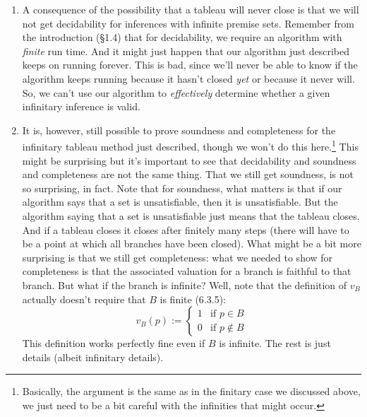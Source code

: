 \begin{enumerate}[\thesection.1]
		\item A consequence of the possibility that a tableau will never close is that we will not get decidability for inferences with infinite premise sets. Remember from the introduction (\S1.4) that for decidability, we require an algorithm with \emph{finite} run time. And it might just happen that our algorithm just described keeps on running forever. This is bad, since we'll never be able to know if the algorithm keeps running because it hasn't closed \emph{yet} or because it never will. So, we can't use our algorithm to \emph{effectively} determine whether a given infinitary inference is valid. 
	
		\item It is, however, still possible to prove soundness and completeness for the infinitary tableau method just described, though we won't do this here.\footnote{Basically, the argument is the same as in the finitary case we discussed above, we just need to be a bit careful with the infinities that might occur.} This might be surprising but it's important to see that decidability and soundness and completeness are not the same thing. That we still get soundness, is not so surprising, in fact. Note that for soundness, what matters is that if our algorithm says that a set is unsatisfiable, then it is unsatisfiable. But the algorithm saying that a set is unsatisfiable just means that the tableau closes. And if a tableau closes it closes after finitely many steps (there will have to be a point at which all branches have been closed). What might be a bit more surprising is that we still get completeness: what we needed to show for completeness is that the associated valuation for a branch is faithful to that branch. But what if the branch is infinite? Well, note that the definition of $v_B$ actually doesn't require that $B$ is finite (6.3.5):
		\[v_B(p):=\begin{cases} 1 &\text{if }p\in B\\0&\text{if }p\notin B\end{cases}\]	
		This definition works perfectly fine even if $B$ is infinite. The rest is just details (albeit infinitary details).
		

\end{enumerate}
